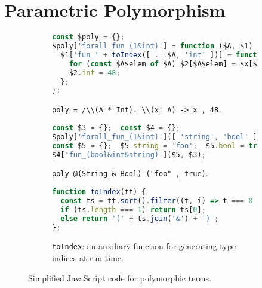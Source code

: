 \section{Parametric Polymorphism} \label{sec:poly}

\begin{figure}[t]
\begin{subfigure}{\textwidth}
\begin{lstlisting}[language=TypeScript]
const $poly = {};
$poly['forall_fun_(1&int)'] = function ($A, $1) {
  $1['fun_' + toIndex([ ...$A, 'int' ])] = function ($x, $2) {
    for (const $A$elem of $A) $2[$A$elem] = $x[$A$elem];
    $2.int = 48;
  };
};
\end{lstlisting}
\caption{\lstinline{poly = /\\(A * Int). \\(x: A) -> x , 48}.} \label{fig:poly-def}
\end{subfigure}
\par\bigskip
\begin{subfigure}{\textwidth}
\begin{lstlisting}[language=TypeScript,deletekeywords=string]
const $3 = {};  const $4 = {};
$poly['forall_fun_(1&int)']([ 'string', 'bool' ], $4);
const $5 = {};  $5.string = 'foo';  $5.bool = true;
$4['fun_(bool&int&string)']($5, $3);
\end{lstlisting}
\caption{\lstinline{poly @(String & Bool) ("foo" , true)}.} \label{fig:poly-app}
\end{subfigure}
\par\bigskip
\begin{subfigure}{\textwidth}
\begin{lstlisting}[language=TypeScript]
function toIndex(tt) {
  const ts = tt.sort().filter((t, i) => t === 0 || t !== tt[i-1]);
  if (ts.length === 1) return ts[0];
  else return '(' + ts.join('&') + ')';
};
\end{lstlisting}
\caption{\lstinline{toIndex}: an auxiliary function for generating type indices at run time.} \label{fig:toIndex}
\end{subfigure}
\caption{Simplified JavaScript code for polymorphic terms.}
\end{figure}

